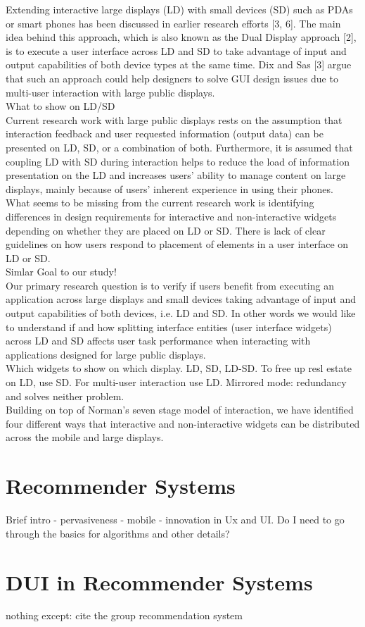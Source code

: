 Extending interactive large displays (LD) with small devices (SD) such as PDAs
or smart phones has been discussed in earlier research efforts [3, 6]. The main
idea behind this approach, which is also known as the Dual Display approach [2],
is to execute a user interface across LD and SD to take advantage of input and
output capabilities of both device types at the same time. Dix and Sas [3] argue
that such an approach could help designers to solve GUI design issues due to multi-user interaction with large public displays.\\

What to show on LD/SD\\
Current research work with large public displays rests on the assumption that
interaction feedback and user requested information (output data) can be
presented on LD, SD, or a combination of both. Furthermore, it is assumed that
coupling LD with SD during interaction helps to reduce the load of information presentation on the LD and increases users’ ability to manage content on large displays, mainly because of users’ inherent experience in using their phones. What seems to be missing from the current research work is identifying differences in design requirements for interactive and non-interactive widgets depending on whether they are placed on LD or SD. There is lack of clear guidelines on how users respond to placement of elements in a user interface on LD or SD.\\

Simlar Goal to our study!\\
Our primary research question is to verify if users benefit from executing an
application across large displays and small devices taking advantage of input
and output capabilities of both devices, i.e. LD and SD. In other words we would
like to understand if and how splitting interface entities (user interface widgets) across LD and SD affects user task performance when interacting with applications designed for large public displays.\\

Which widgets to show on which display. LD, SD, LD-SD. To free up resl estate on
LD, use SD.
For multi-user interaction use LD. Mirrored mode: redundancy and solves neither
problem.\\
Building on top of Norman’s seven stage model of interaction, we have identified
four different ways that interactive and non-interactive widgets can be
distributed across the mobile and large displays.\\



\section{Recommender Systems}
Brief intro - pervasiveness - mobile - innovation in Ux and UI.
Do I need to go through the basics for algorithms and other details?
 
\section{DUI in Recommender Systems}
nothing except: cite the group recommendation system
